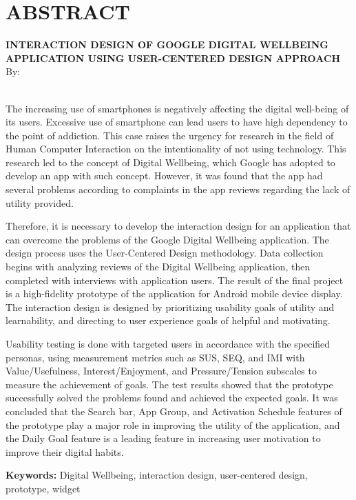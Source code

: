 \clearpage
\chapter*{ABSTRACT}

\begin{center}
  \textbf{\MakeUppercase{Interaction Design of Google Digital Wellbeing Application using User-Centered Design Approach}} \\[1em]
  
  By: \\
  \MakeUppercase{\theauthor} \\

\end{center}

\begin{singlespace}
  The increasing use of smartphones is negatively affecting the digital well-being of its users. Excessive use of smartphone can lead users to have high dependency to the point of addiction. This case raises the urgency for research in the field of Human Computer Interaction on the intentionality of not using technology. This research led to the concept of Digital Wellbeing, which Google has adopted to develop an app with such concept. However, it was found that the app had several problems according to complaints in the app reviews regarding the lack of utility provided.

  Therefore, it is necessary to develop the interaction design for an application that can overcome the problems of the Google Digital Wellbeing application. The design process uses the User-Centered Design methodology. Data collection begins with analyzing reviews of the Digital Wellbeing application, then completed with interviews with application users. The result of the final project is a high-fidelity prototype of the application for Android mobile device display. The interaction design is designed by prioritizing usability goals of utility and learnability, and directing to user experience goals of helpful and motivating.

  Usability testing is done with targeted users in accordance with the specified personas, using measurement metrics such as SUS, SEQ, and IMI with Value/Usefulness, Interest/Enjoyment, and Pressure/Tension subscales to measure the achievement of goals. The test results showed that the prototype successfully solved the problems found and achieved the expected goals. It was concluded that the Search bar, App Group, and Activation Schedule features of the prototype play a major role in improving the utility of the application, and the Daily Goal feature is a leading feature in increasing user motivation to improve their digital habits.

  \noindent \textbf{Keywords:} Digital Wellbeing, interaction design, user-centered design, prototype, widget

\end{singlespace}
